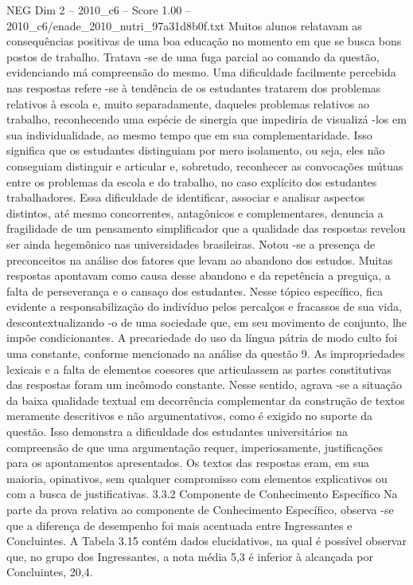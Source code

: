 \begin{textsample}{NEG Dim 2 – 2010\_c6 – Score 1.00 – 2010\_c6/enade\_2010\_nutri\_97a31d8b0f.txt}
Muitos alunos relatavam as consequências positivas de uma boa educação no momento em que se busca bons postos de trabalho.
Tratava -se de uma fuga parcial ao comando da questão, evidenciando má compreensão do mesmo.
Uma dificuldade facilmente percebida nas respostas refere -se à tendência de os estudantes tratarem dos problemas relativos à escola e, muito separadamente, daqueles problemas relativos ao trabalho, reconhecendo uma espécie de sinergia que impediria de visualizá -los em sua individualidade, ao mesmo tempo que em sua complementaridade.
Isso significa que os estudantes distinguiam por mero isolamento, ou seja, eles não conseguiam distinguir e articular e, sobretudo, reconhecer as convocações mútuas entre os problemas da escola e do trabalho, no caso explícito dos estudantes trabalhadores.
Essa dificuldade de identificar, associar e analisar aspectos distintos, até mesmo concorrentes, antagônicos e complementares, denuncia a fragilidade de um pensamento simplificador que a qualidade das respostas revelou ser ainda hegemônico nas universidades brasileiras.
Notou -se a presença de preconceitos na análise dos fatores que levam ao abandono dos estudos.
Muitas respostas apontavam como causa desse abandono e da repetência a preguiça, a falta de perseverança e o cansaço dos estudantes.
Nesse tópico específico, fica evidente a responsabilização do indivíduo pelos percalços e fracassos de sua vida, descontextualizando -o de uma sociedade que, em seu movimento de conjunto, lhe impõe condicionantes.
A precariedade do uso da língua pátria de modo culto foi uma constante, conforme mencionado na análise da questão 9.
As impropriedades lexicais e a falta de elementos coesores que articulassem as partes constitutivas das respostas foram um incômodo constante.
Nesse sentido, agrava -se a situação da baixa qualidade textual em decorrência complementar da construção de textos meramente descritivos e não argumentativos, como é exigido no suporte da questão.
Isso demonstra a dificuldade dos estudantes universitários na compreensão de que uma argumentação requer, imperiosamente, justificações para os apontamentos apresentados.
Os textos das respostas eram, em sua maioria, opinativos, sem qualquer compromisso com elementos explicativos ou com a busca de justificativas. 3.3.2 Componente de Conhecimento Específico Na parte da prova relativa ao componente de Conhecimento Específico, observa -se que a diferença de desempenho foi mais acentuada entre Ingressantes e Concluintes.
A Tabela 3.15 contém dados elucidativos, na qual é possível observar que, no grupo dos Ingressantes, a nota média 5,3 é inferior à alcançada por Concluintes, 20,4.

\end{textsample}
